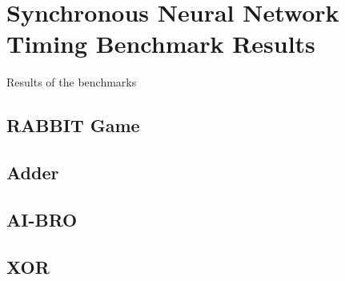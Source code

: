 \section{Synchronous Neural Network Timing Benchmark Results}
Results of the benchmarks

\subsection{RABBIT Game}

\subsection{Adder}

\subsection{AI-BRO}

\subsection{XOR}